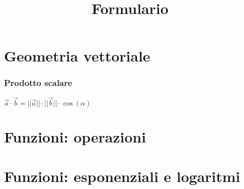 \documentclass{article}
\title{Formulario}
\begin{document}
\section{Geometria vettoriale}

\subsubsection*{Prodotto scalare}
$\vec{a} \cdot \vec{b}=||\vec{a}|| \cdot ||\vec{b}|| \cdot \cos(\alpha)$
\section{Funzioni: operazioni}

\section{Funzioni: esponenziali e logaritmi}
\end{document}
